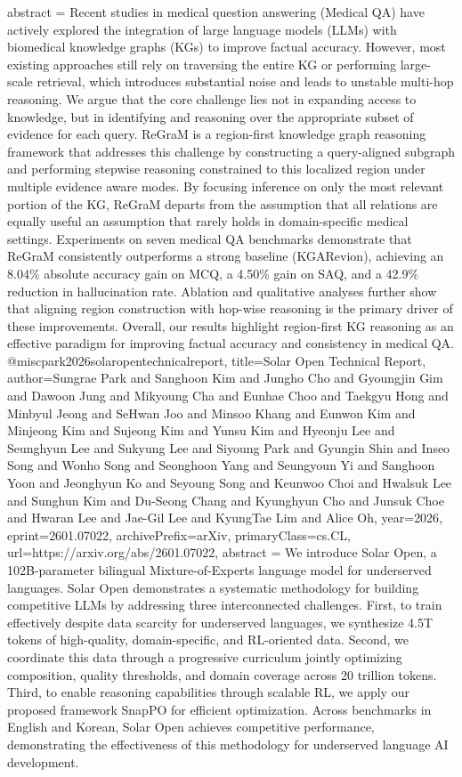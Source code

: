 {      abstract = {Recent studies in medical question answering (Medical QA) have actively explored the integration of large language models (LLMs) with biomedical knowledge graphs (KGs) to improve factual accuracy. However, most existing approaches still rely on traversing the entire KG or performing large-scale retrieval, which introduces substantial noise and leads to unstable multi-hop reasoning. We argue that the core challenge lies not in expanding access to knowledge, but in identifying and reasoning over the appropriate subset of evidence for each query. ReGraM is a region-first knowledge graph reasoning framework that addresses this challenge by constructing a query-aligned subgraph and performing stepwise reasoning constrained to this localized region under multiple evidence aware modes. By focusing inference on only the most relevant portion of the KG, ReGraM departs from the assumption that all relations are equally useful an assumption that rarely holds in domain-specific medical settings. Experiments on seven medical QA benchmarks demonstrate that ReGraM consistently outperforms a strong baseline (KGARevion), achieving an 8.04\% absolute accuracy gain on MCQ, a 4.50\% gain on SAQ, and a 42.9\% reduction in hallucination rate. Ablation and qualitative analyses further show that aligning region construction with hop-wise reasoning is the primary driver of these improvements. Overall, our results highlight region-first KG reasoning as an effective paradigm for improving factual accuracy and consistency in medical QA.}
}@misc{park2026solaropentechnicalreport,
      title={Solar Open Technical Report}, 
      author={Sungrae Park and Sanghoon Kim and Jungho Cho and Gyoungjin Gim and Dawoon Jung and Mikyoung Cha and Eunhae Choo and Taekgyu Hong and Minbyul Jeong and SeHwan Joo and Minsoo Khang and Eunwon Kim and Minjeong Kim and Sujeong Kim and Yunsu Kim and Hyeonju Lee and Seunghyun Lee and Sukyung Lee and Siyoung Park and Gyungin Shin and Inseo Song and Wonho Song and Seonghoon Yang and Seungyoun Yi and Sanghoon Yoon and Jeonghyun Ko and Seyoung Song and Keunwoo Choi and Hwalsuk Lee and Sunghun Kim and Du-Seong Chang and Kyunghyun Cho and Junsuk Choe and Hwaran Lee and Jae-Gil Lee and KyungTae Lim and Alice Oh},
      year={2026},
      eprint={2601.07022},
      archivePrefix={arXiv},
      primaryClass={cs.CL},
      url={https://arxiv.org/abs/2601.07022},
      abstract = {We introduce Solar Open, a 102B-parameter bilingual Mixture-of-Experts language model for underserved languages. Solar Open demonstrates a systematic methodology for building competitive LLMs by addressing three interconnected challenges. First, to train effectively despite data scarcity for underserved languages, we synthesize 4.5T tokens of high-quality, domain-specific, and RL-oriented data. Second, we coordinate this data through a progressive curriculum jointly optimizing composition, quality thresholds, and domain coverage across 20 trillion tokens. Third, to enable reasoning capabilities through scalable RL, we apply our proposed framework SnapPO for efficient optimization. Across benchmarks in English and Korean, Solar Open achieves competitive performance, demonstrating the effectiveness of this methodology for underserved language AI development.}
}
